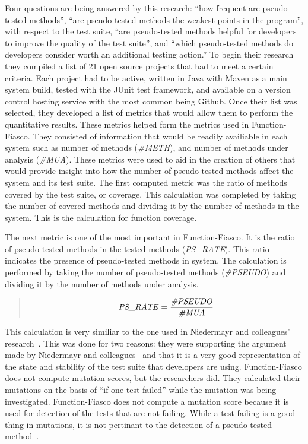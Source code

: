 Four questions are being answered by this research: ``how frequent are pseudo-tested methods'', ``are pseudo-tested methods the weakest points in the program'', with respect to the test suite, ``are pseudo-tested methods helpful for developers to improve the quality of the test suite'', and ``which pseudo-tested methods do developers consider worth an additional testing action.'' To begin their research they compiled a list of 21 open source projects that had to meet a certain criteria. Each project had to be active, written in Java with Maven as a main system build, tested with the JUnit test framework, and available on a version control hosting service with the most common being Github. Once their list was selected, they developed a list of metrics that would allow them to perform the quantitative results. These metrics helped form the metrics used in Function-Fiasco. They consisted of information that would be readily availiable in each system such as number of methods (\textit{\#METH}), and number of methods under analysis (\textit{\#MUA}). These metrics were used to aid in the creation of others that would provide insight into how the number of pseudo-tested methods affect the system and its test suite. The first computed metric was the ratio of methods covered by the test suite, or coverage. This calculation was completed by taking the number of covered methods and dividing it by the number of methods in the system. This is the calculation for function coverage.

 The next metric is one of the most important in Function-Fiasco. It is the ratio of pseudo-tested methods in the tested methods (\textit{PS\_RATE}). This ratio indicates the presence of pseudo-tested methods in system. The calculation is performed by taking the number of pseudo-tested methods (\textit{\#PSEUDO}) and dividing it by the number of methods under analysis.

\begin{quote}
\begin{equation}
 \mbox{\emph{PS\_RATE}} = \frac{\mbox{\emph{\#PSEUDO}}}{\mbox{\emph{\#MUA}}}
\end{equation}
\end{quote}

This calculation is very similiar to the one used in Niedermayr and colleagues' research~\cite{niedermayr2016will}. This was done for two reasons: they were supporting the argument made by Niedermayr and colleagues~\cite{niedermayr2016will} and that it is a very good representation of the state and stability of the test suite that developers are using. Function-Fiasco does not compute mutation scores, but the researchers did. They calculated their mutations on the basis of ``if one test failed'' while the mutation was being investigated. Function-Fiasco does not compute a mutation score because it is used for detection of the tests that are not failing. While a test failing is a good thing in mutations, it is not pertinant to the detection of a pseudo-tested method~\cite{vera2017comprehensive}.

